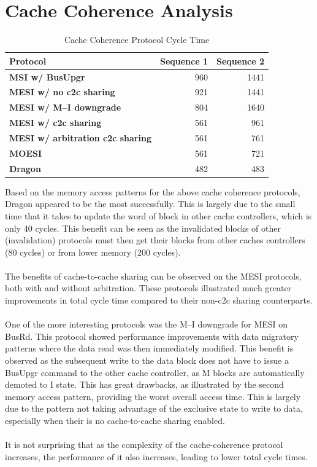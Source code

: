 \documentclass[12pt, letterpaper]{report}
\begin{document}
\section{Cache Coherence Analysis}

\begin{table}[H]
	\centering
	\begin{tabular}{ |l|r|r| }
		\hline
		\textbf{Protocol} & \textbf{Sequence 1} & \textbf{Sequence 2} \\
		\hline
		\textbf{MSI w/ BusUpgr} & 960 & 1441 \\
		\hline
		\textbf{MESI w/ no c2c sharing} & 921 & 1441 \\
		\hline
		\textbf{MESI w/ M--I downgrade} & 804 & 1640 \\
		\hline
		\textbf{MESI w/ c2c sharing} & 561 & 961 \\
		\hline
		\textbf{MESI w/ arbitration c2c sharing} & 561 & 761 \\
		\hline
		\textbf{MOESI} & 561 & 721 \\
		\hline
		\textbf{Dragon} & 482 & 483 \\
		\hline	
	\end{tabular}
	\caption{Cache Coherence Protocol Cycle Time}
\end{table}


Based on the memory access patterns for the above cache coherence protocols, Dragon appeared to be the most successfully. This is largely due to the small time that it takes to update the word of block in other cache controllers, which is only 40 cycles. This benefit can be seen as the invalidated blocks of other (invalidation) protocols must then get their blocks from other caches controllers (80 cycles) or from lower memory (200 cycles).
\\ \\
The benefits of cache-to-cache sharing can be observed on the MESI protocols, both with and without arbitration. These protocols illustrated much greater improvements in total cycle time compared to their non-c2c sharing counterparts.
\\ \\
One of the more interesting protocols was the M--I downgrade for MESI on BusRd. This protocol showed performance improvements with data migratory patterns where the data read was then immediately modified. This benefit is observed as the subsequent write to the data block does not have to issue a BusUpgr command to the other cache controller, as M blocks are automatically demoted to I state. This has great drawbacks, as illustrated by the second memory access pattern, providing the worst overall access time. This is largely due to the pattern not taking advantage of the exclusive state to write to data, especially when their is no cache-to-cache sharing enabled.
\\ \\
It is not surprising that as the complexity of the cache-coherence protocol increases, the performance of it also increases, leading to lower total cycle times.
\end{document}
